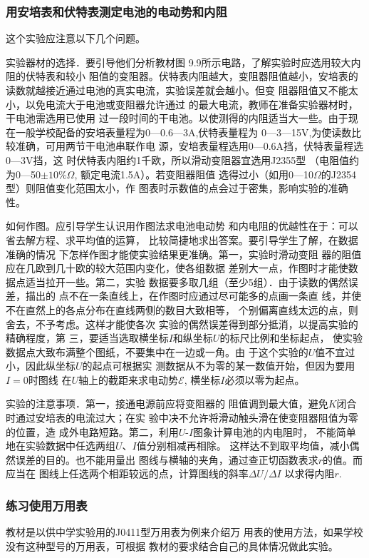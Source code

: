 \subsubsection{用安培表和伏特表测定电池的电动势和内阻}
这个实验应注意以下几个问题。

实验器材的选择．要引导他们分析教材图
9.9所示电路，了解实验时应选用较大内阻的伏特表和较小
阻值的变阻器。伏特表内阻越大，变阻器阻值越小，安培表的
读数就越接近通过电池的真实电流，实验误差就会越小。但变
阻器阻值又不能太小，以免电流大于电池或变阻器允许通过
的最大电流，教师在准备实验器材时，干电池需选用已使用
过一段时间的干电池。以使测得的内阻适当大一些。由于现
在一般学校配备的安培表量程为0—0.6—3A,伏特表量程为
0—3—15V,为使读数比较准确，可用两节干电池串联作电
源，安培表量程选用0—0.6A挡，伏特表量程选0—3V挡，这
时伏特表内阻约1千欧，所以滑动变阻器宜选用J2355型
（电阻值约为0—50$\pm 10\%\Omega$, 额定电流1.5A）。若变阻器阻值
选得过小（如用0—10$\Omega$的J2354型）则阻值变化范围太小，作
图表时示数值的点会过于密集，影响实验的准确性。

如何作图。应引导学生认识用作图法求电池电动势
和内电阻的优越性在于：可以省去解方程、求平均值的运算，
比较简捷地求出答案。要引导学生了解，在数据准确的情况
下怎样作图才能使实验结果更准确。第一，实验时滑动变阻
器的阻值应在几欧到几十欧的较大范围内变化，使各组数据
差别大一点，作图时才能使数据点适当拉开一些。第二，实验
数据要多取几组（至少5组）．由于读数的偶然误差，描出的
点不在一条直线上，在作图时应通过尽可能多的点画一条直
线，并使不在直然上的各点分布在直线两侧的数目大致相等，
个别偏离直线太远的点，则舍去，不予考虑。这样才能使各次
实验的偶然误差得到部分抵消，以提高实验的精确程度，第
三，要适当选取横坐标$I$和纵坐标$U$的标尺比例和坐标起点，
使实验数据点大致布满整个图纸，不要集中在一边或一角。由
于这个实验的$U$值不宜过小，因此纵坐标$U$的起点可根据实
测数据从不为零的某一数值开始，但因为要用$I=0$时图线
在$U$轴上的截距来求电动势$\mathcal{E}$, 横坐标$I$必须以零为起点。

实验的注意事项．第一，接通电源前应将变阻器的
阻值调到最大值，避免$K$闭合时通过安培表的电流过大；在实
验中决不允许将滑动触头滑在使变阻器阻值为零的位置，造
成外电路短路。第二，利用$U$-$I$图象计算电池的内电阻时，
不能简单地在实验数据中任选两组$U$、$I$值分别相减再相除。
这样达不到取平均值，减小偶然误差的目的。也不能用量出
图线与横轴的夹角，通过查正切函数表求$r$的值。而应当在
图线上任选两个相距较远的点，计算图线的斜率$\Delta U/\Delta I$
以求得内阻$r$.


\subsubsection{练习使用万用表}
教材是以供中学实验用的J0411型万用表为例来介绍万
用表的使用方法，如果学校没有这种型号的万用表，可根据
教材的要求结合自己的具体情况做此实验。

